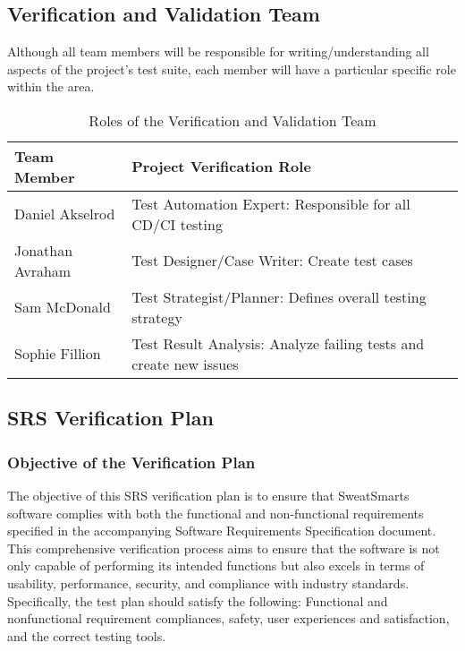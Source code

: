 \documentclass[12pt, titlepage]{article}
\begin{document}
\subsection{Verification and Validation Team}

Although all team members will be responsible for writing/understanding all aspects of the project's test suite, each member will have a particular specific role within the area.

\begin{table}[h]
  \centering
  \begin{tabular}{|l|l|}
    \hline
    \textbf{Team Member} & \textbf{Project Verification Role} \\
    \hline
    Daniel Akselrod & Test Automation Expert: Responsible for all CD/CI testing \\
    \hline
    Jonathan Avraham & Test Designer/Case Writer: Create test cases \\
    \hline
    Sam McDonald & Test Strategist/Planner: Defines overall testing strategy \\
    \hline
    Sophie Fillion & Test Result Analysis: Analyze failing tests and create new issues \\
    \hline
  \end{tabular}
  \caption{Roles of the Verification and Validation Team}
  \label{tab:verification_validation_team}
\end{table}

\subsection{SRS Verification Plan}

\subsubsection{Objective of the Verification Plan}
The objective of this SRS verification plan is to ensure that SweatSmarts software complies with both the functional and non-functional requirements specified in the accompanying Software Requirements Specification document. This comprehensive verification process aims to ensure that the software is not only capable of performing its intended functions but also excels in terms of usability, performance, security, and compliance with industry standards. Specifically, the test plan should satisfy the following: Functional and nonfunctional requirement compliances, safety, user experiences and satisfaction, and the correct testing tools.
\end{document}
